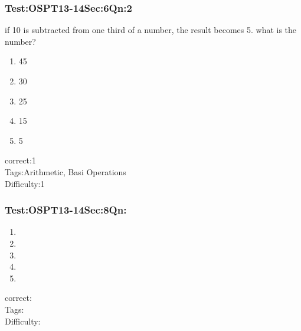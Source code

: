\documentclass[]{beamer}
\begin{document}
    \begin{frame}
	    \frametitle{Test:OSPT13-14\hspace{2mm}Sec:6\hspace{2mm}Qn:2}
	    if 10 is subtracted from one third of a number, the result becomes 5. what is the number?
	   \begin{enumerate}
	        \item
	           45
	        \item
	            30
	        \item
	           25
	        \item
	            15
	        \item
	           5
	    \end{enumerate}
	    correct:1\\   
	    Tags:Arithmetic, Basi Operations \\
	    Difficulty:1   \\
    \end{frame}    
    \begin{frame}
	    \frametitle{Test:OSPT13-14\hspace{2mm}Sec:8\hspace{2mm}Qn:}
	   \begin{enumerate}
	        \item
	           
	        \item
	            
	        \item
	           
	        \item
	            
	        \item
	           
	    \end{enumerate}
	    correct:\\   
	    Tags: \\
	    Difficulty:   \\
    \end{frame}    
\end{document}
